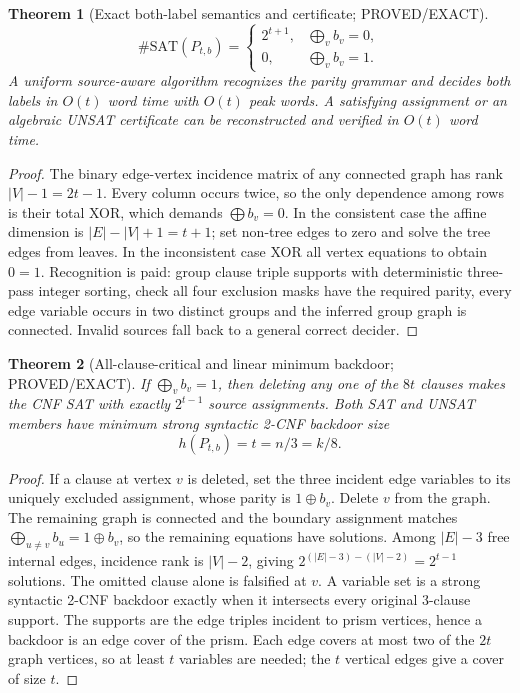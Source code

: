 \documentclass[11pt]{article}
\newtheorem{theorem}{Theorem}
\begin{document}
\begin{theorem}[Exact both-label semantics and certificate; PROVED/EXACT]
\[
\#\mathrm{SAT}(P_{t,b})=
\begin{cases}2^{t+1},&\bigoplus_v b_v=0,\\0,&\bigoplus_v b_v=1.\end{cases}
\]
A uniform source-aware algorithm recognizes the parity grammar and decides both labels in $O(t)$ word time with $O(t)$ peak words. A satisfying assignment or an algebraic UNSAT certificate can be reconstructed and verified in $O(t)$ word time.
\end{theorem}
\begin{proof}
The binary edge-vertex incidence matrix of any connected graph has rank $|V|-1=2t-1$. Every column occurs twice, so the only dependence among rows is their total XOR, which demands $\bigoplus b_v=0$. In the consistent case the affine dimension is $|E|-|V|+1=t+1$; set non-tree edges to zero and solve the tree edges from leaves. In the inconsistent case XOR all vertex equations to obtain $0=1$. Recognition is paid: group clause triple supports with deterministic three-pass integer sorting, check all four exclusion masks have the required parity, every edge variable occurs in two distinct groups and the inferred group graph is connected. Invalid sources fall back to a general correct decider.
\end{proof}

\begin{theorem}[All-clause-critical and linear minimum backdoor; PROVED/EXACT]
If $\bigoplus_vb_v=1$, then deleting any one of the $8t$ clauses makes the CNF SAT with exactly $2^{t-1}$ source assignments. Both SAT and UNSAT members have minimum strong syntactic 2-CNF backdoor size
\[
h(P_{t,b})=t=n/3=k/8.
\]
\end{theorem}
\begin{proof}
If a clause at vertex $v$ is deleted, set the three incident edge variables to its uniquely excluded assignment, whose parity is $1\oplus b_v$. Delete $v$ from the graph. The remaining graph is connected and the boundary assignment matches $\bigoplus_{u\ne v}b_u=1\oplus b_v$, so the remaining equations have solutions. Among $|E|-3$ free internal edges, incidence rank is $|V|-2$, giving $2^{(|E|-3)-(|V|-2)}=2^{t-1}$ solutions. The omitted clause alone is falsified at $v$.
A variable set is a strong syntactic 2-CNF backdoor exactly when it intersects every original 3-clause support. The supports are the edge triples incident to prism vertices, hence a backdoor is an edge cover of the prism. Each edge covers at most two of the $2t$ graph vertices, so at least $t$ variables are needed; the $t$ vertical edges give a cover of size $t$.
\end{proof}
\end{document}
